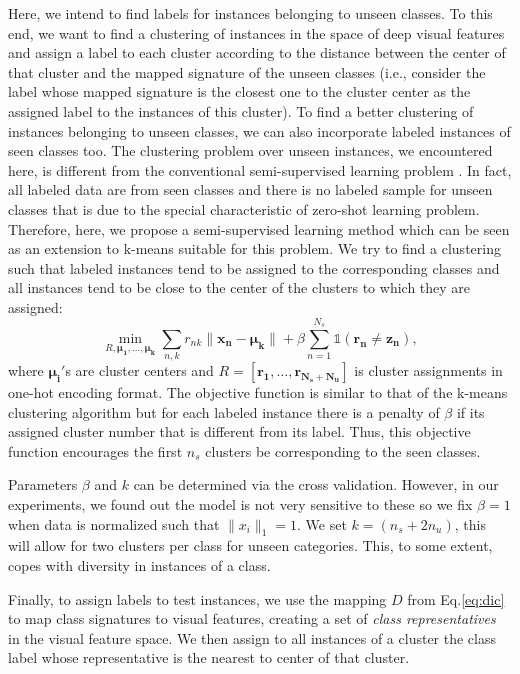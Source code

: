 \documentclass[10pt,twocolumn,letterpaper]{article}
\DeclareMathOperator*{\minimize}{min}
\begin{document}
Here, we intend to find labels for instances belonging to unseen classes. To this end, we want to find a clustering of instances in the space of deep visual features and assign a label to each cluster according to the distance between the center of that cluster and the mapped signature of the unseen classes (i.e., consider the label whose mapped signature is the closest one to the cluster center as the assigned label to the instances of this cluster). To find a better clustering of instances belonging to unseen classes, we can also incorporate labeled instances of seen classes too. The clustering problem over unseen instances, we encountered here, is different from the conventional semi-supervised learning problem \cite{chapel06}.
In fact, all labeled data are from seen classes and there is no labeled sample for unseen classes that is due to the special characteristic of zero-shot learning problem. Therefore, here, we propose a semi-supervised learning method which
can be seen as an extension to k-means suitable for this problem.
 We try to find a clustering such that labeled instances tend to be assigned to the corresponding classes and all instances tend to be close to the center of the clusters to which they are assigned:
\begin{equation} \label{eq:simple}
\minimize_{R, \mathbf{\mu_1, \ldots, \mu_k }}  \sum_{n,k} r_{nk} \lVert \mathbf{x_n - \mu_k} \rVert +
 \beta \sum_{n=1}^{N_s} \mathds{1}(\mathbf{r_n \neq z_n}),
\end{equation}
where $\mathbf{\mu_i'}$s are cluster centers and $R = [\mathbf{r_1, \ldots, r_{N_s + N_u }} ]$ is cluster assignments in one-hot encoding format.
The objective function is similar to that of the k-means clustering algorithm but for each labeled instance there is a penalty of $\beta$ if its assigned cluster number that is different from its label. Thus, this objective function encourages
the first $n_s$ clusters be corresponding to the seen classes.

Parameters $\beta$ and $k$ can be determined via the cross validation. However, in our experiments, we found out
the model is not very sensitive to these so we fix $\beta=1$
when data is normalized such that $\lVert x_i \rVert_1 = 1$. We set $k =  (n_s + 2n_u)$, this
will allow for two clusters per class for unseen categories. This, to some extent, copes with diversity in instances of a class.


Finally, to assign labels to test instances, we use the mapping $D$ from Eq.\eqref{eq:dic} to
map class signatures to visual features, creating a set of \textit{class representatives}
 in the visual feature space. We then assign to all instances of a cluster the class label whose representative is
  the nearest to center of that cluster.
\end{document}
